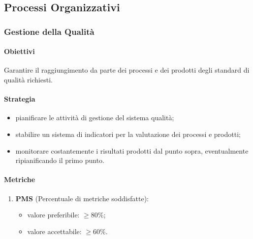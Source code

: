 \subsection{Processi Organizzativi}
    \subsubsection{Gestione della Qualità}
        \paragraph{Obiettivi}
            Garantire il raggiungimento da parte dei processi e dei prodotti degli standard di qualità richiesti.
        \paragraph{Strategia}
            \begin{itemize}
                \item pianificare le attività di gestione del sistema qualità;
                \item stabilire un sistema di indicatori per la valutazione dei processi e prodotti;
                \item monitorare costantemente i risultati prodotti dal punto sopra, eventualmente ripianificando il primo punto.
            \end{itemize}
        \paragraph{Metriche}
        \begin{enumerate}
        \item \textbf{PMS} (Percentuale di metriche soddisfatte):
        \begin{itemize}
            \item valore preferibile: $\geq 80\%$;
            \item valore accettabile: $\geq 60\%$.
        \end{itemize}
    \end{enumerate}